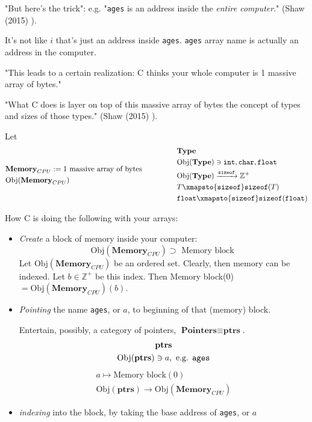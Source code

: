 \documentclass[10pt]{amsart}
\begin{document}
\begin{multicols*}{2}
"But here's the trick": e.g. "\verb|ages| is an address inside the \emph{entire computer}." (Shaw (2015) \cite{Shaw2015}).  

It's not like $i$ that's just an address inside \verb|ages|.  \verb|ages| array name is actually an address in the computer.     

"This leads to a certain realization: C thinks your whole computer is 1 massive array of bytes."  

"What C does is layer on top of this massive array of bytes the concept of types and sizes of those types." (Shaw (2015) \cite{Shaw2015}).  


Let 
\[
\begin{gathered}
\begin{aligned}
& \textbf{Memory}_{CPU} := 1 \text{ massive array of bytes } \\
& \text{Obj}{(\textbf{Memory}_{CPU})} 
\end{aligned}  \qquad \, \qquad \, 
\begin{aligned}
	& \textbf{Type} \\
	& \text{Obj}{(\textbf{Type})} \ni \verb|int|, \verb|char|, \verb|float| \\
	& \text{Obj}{(\textbf{Type})}  \xrightarrow{\texttt{sizeof}} \mathbb{Z}^+  \\
	& T \xmapsto{ \texttt{sizeof} } \verb|sizeof|(T) \\
	& \verb|float| \xmapsto{ \texttt{sizeof}} \verb|sizeof|(\verb|float|)
\end{aligned}
\end{gathered}
\]


  How C is doing the following with your arrays:  

\begin{itemize}
	\item \emph{Create} a block of memory inside your computer:  
	\[
	\text{Obj}{(\textbf{Memory}_{CPU})} \supset \text{ Memory block }  
	\]
	Let $\text{Obj}{(\textbf{Memory}_{CPU})}$ be an ordered set.  Clearly, then memory can be indexed.  Let $b\in \mathbb{Z}^+$ be this index.  Then Memory block(0) $= \text{Obj}{(\textbf{Memory}_{CPU})}(b)$.  		
	\item \emph{Pointing} the name \verb|ages|, or $a$, to beginning of that (memory) block.  
	
		Entertain, possibly, a category of pointers, $\textbf{Pointers} \equiv \textbf{ptrs}$.  
\[
\begin{gathered}
	\textbf{ptrs} \\
	\text{Obj}{(\textbf{ptrs})} \ni a, \text{ e.g. } \verb|ages|  
\end{gathered}
\]	
\[
	\begin{gathered}
	a \mapsto \text{Memory block}(0) \\ 
	\text{Obj}{(\textbf{ptrs})} \to \text{Obj}{(\textbf{Memory}_{CPU})}
\end{gathered}
\]
	\item \emph{indexing} into the block, by taking the base address of \verb|ages|, or $a$ 
\end{itemize}


\end{multicols*}
\end{document}
